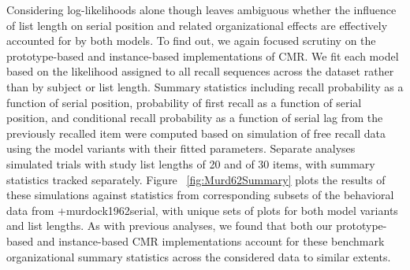 {}Considering log-likelihoods alone though leaves ambiguous whether the influence of list length on serial position and related organizational effects are effectively accounted for by both models. To find out, we again focused scrutiny on the prototype-based and instance-based implementations of CMR. We fit each model based on the likelihood assigned to all recall sequences across the dataset rather than by subject or list length. Summary statistics including recall probability as a function of serial position, probability of first recall as a function of serial position, and conditional recall probability as a function of serial lag from the previously recalled item were computed based on simulation of free recall data using the model variants with their fitted parameters. Separate analyses simulated trials with study list lengths of 20 and of 30 items, with summary statistics tracked separately. Figure ~\ref{fig:Murd62Summary} plots the results of these simulations against statistics from corresponding subsets of the behavioral data from +{}{}{murdock1962serial}, with unique sets of plots for both model variants and list lengths. As with previous analyses, we found that both our prototype-based and instance-based CMR implementations account for these benchmark organizational summary statistics across the considered data to similar extents.\relax
